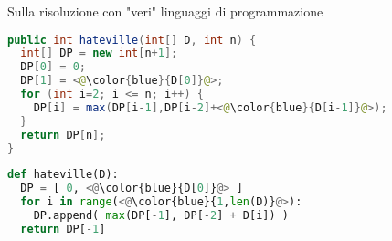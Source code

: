 \begin{frame}{Sulla risoluzione con "veri" linguaggi di programmazione}

\small
\vspace{-9pt}
\begin{myboxtitle}[Java]
\vspace{-8pt}
\begin{lstlisting}[language=java]
public int hateville(int[] D, int n) {
  int[] DP = new int[n+1];
  DP[0] = 0;
  DP[1] = <@\color{blue}{D[0]}@>;
  for (int i=2; i <= n; i++) {
    DP[i] = max(DP[i-1],DP[i-2]+<@\color{blue}{D[i-1]}@>);
  }
  return DP[n];
}
\end{lstlisting}
\vspace{-8pt}
\end{myboxtitle}

\begin{myboxtitle}[Python]
\vspace{-8pt}
\begin{lstlisting}[language=python]
def hateville(D):
  DP = [ 0, <@\color{blue}{D[0]}@> ]
  for i in range(<@\color{blue}{1,len(D)}@>):
    DP.append( max(DP[-1], DP[-2] + D[i]) )
  return DP[-1]
\end{lstlisting}
\vspace{-8pt}
\end{myboxtitle}


\end{frame}



